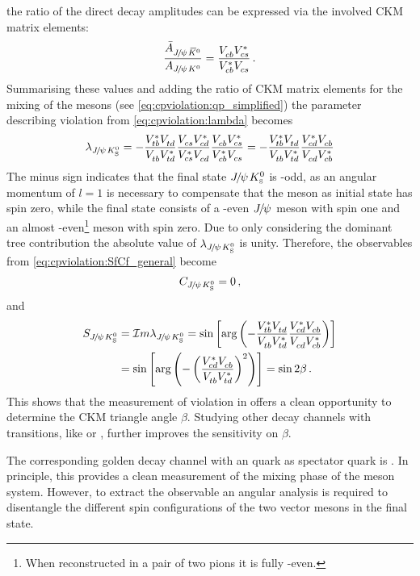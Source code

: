 the ratio of the direct decay amplitudes can be expressed via the involved CKM
matrix elements:
\begin{align}
	\frac{\bar{A}_{{{J\mskip -3mu/\mskip -2mu\psi\mskip 2mu}}{{\kern 0.2em\overline{\kern -0.2em K}{}}{}^0}}}{A_{{{J\mskip -3mu/\mskip -2mu\psi\mskip 2mu}}{{K}^0}}} = \frac{{V_{{c}{b}}^{}}{V_{{c}{s}}^\ast}}{{V_{{c}{b}}^\ast}{V_{{c}{s}}^{}}}\,.
\end{align}
Summarising these values and adding the ratio of CKM matrix elements for the
mixing of the \Bd mesons (see \cref{eq:cpviolation:qp_simplified}) the
parameter describing \CP violation from \cref{eq:cpviolation:lambda} becomes
\begin{align}
	\lambda_{{{J\mskip -3mu/\mskip -2mu\psi\mskip 2mu}}{{K}^0_{\mathrm{ \scriptscriptstyle S}}}} = - \frac{{V_{{t}{b}}^\ast}{V_{{t}{d}}^{}}}{{V_{{t}{b}}^{}}{V_{{t}{d}}^\ast}}\frac{{V_{{c}{s}}^{}}{V_{{c}{d}}^\ast}}{{V_{{c}{s}}^\ast}{V_{{c}{d}}^{}}}\frac{{V_{{c}{b}}^{}}{V_{{c}{s}}^\ast}}{{V_{{c}{b}}^\ast}{V_{{c}{s}}^{}}} = - \frac{{V_{{t}{b}}^\ast}{V_{{t}{d}}^{}}}{{V_{{t}{b}}^{}}{V_{{t}{d}}^\ast}}\frac{{V_{{c}{d}}^\ast}{V_{{c}{b}}^{}}}{{V_{{c}{d}}^{}}{V_{{c}{b}}^\ast}}
\label{eq:lambda_JPsiKS}
\end{align}
The minus sign indicates that the final state ${{J\mskip -3mu/\mskip -2mu\psi\mskip 2mu}}{{K}^0_{\mathrm{ \scriptscriptstyle S}}}$ is \CP-odd, as an
angular momentum of $l = 1$ is necessary to compensate that the \Bd meson as
initial state has spin zero, while the final state consists of a \CP-even
${{J\mskip -3mu/\mskip -2mu\psi\mskip 2mu}}$ meson with spin one and an almost \CP-even\footnote{When reconstructed
in a pair of two pions it is fully \CP-even.} \KS meson with spin zero. Due to
only considering the dominant tree contribution the absolute value of
$\lambda_{{{J\mskip -3mu/\mskip -2mu\psi\mskip 2mu}}{{K}^0_{\mathrm{ \scriptscriptstyle S}}}}$ is unity. Therefore, the \CP observables from
\cref{eq:cpviolation:SfCf_general} become
\begin{align}
	C_{{{J\mskip -3mu/\mskip -2mu\psi\mskip 2mu}}{{K}^0_{\mathrm{ \scriptscriptstyle S}}}} = 0\,,
\end{align}
and
\begin{align}
	S_{{{J\mskip -3mu/\mskip -2mu\psi\mskip 2mu}}{{K}^0_{\mathrm{ \scriptscriptstyle S}}}} &= \mathcal{I}m\lambda_{{{J\mskip -3mu/\mskip -2mu\psi\mskip 2mu}}{{K}^0_{\mathrm{ \scriptscriptstyle S}}}}
			 = \sin\left[\text{arg}\left(-\frac{{V_{{t}{b}}^\ast}{V_{{t}{d}}^{}}}{{V_{{t}{b}}^{}}{V_{{t}{d}}^\ast}}\frac{{V_{{c}{d}}^\ast}{V_{{c}{b}}^{}}}{{V_{{c}{d}}^{}}{V_{{c}{b}}^\ast}}\right)\right]\\
			 &= \sin\left[\text{arg}\left(-\left(\frac{{V_{{c}{d}}^\ast}{V_{{c}{b}}^{}}}{{V_{{t}{b}}^{}}{V_{{t}{d}}^\ast}}\right)^2\right)\right]
			 = \sin 2\beta\,.
\end{align}
This shows that the measurement of \CP violation in \BdToJPsiKS offers a clean
opportunity to determine the CKM triangle angle $\beta$. Studying other decay
channels with \bToccbars transitions, like \BdToJPsiKL or \BdToPsiTwoSKS,
further improves the sensitivity on $\beta$.

The corresponding golden decay channel with an \squark quark as spectator
quark is \myBsToJPsiPhi. In principle, this provides a clean measurement of
the mixing phase \phis of the \Bs meson system. However, to extract the \CP
observable an angular analysis is required to disentangle the
different spin configurations of the two vector mesons in the final state.
